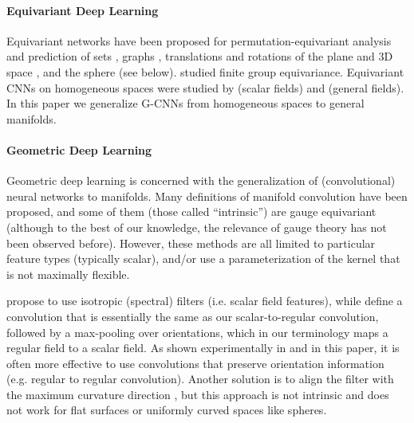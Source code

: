 \documentclass{article}
\begin{document}
\paragraph{Equivariant Deep Learning}
Equivariant networks have been proposed for permutation-equivariant analysis and prediction of sets 
\cite{zaheerDeepSets2017, hartfordDeepModelsInteractions2018}, graphs \cite{kondorCovariantCompositionalNetworks2018, hyPredictingMolecularProperties2018, maronInvariantEquivariantGraph2019}, translations and rotations of the plane and 3D space \cite{oyallonDeepRotoTranslationScattering2015, cohenGroupEquivariantConvolutional2016, cohenSteerableCNNs2017, marcosRotationEquivariantVector2017, weilerLearningSteerableFilters2018, weiler3DSteerableCNNs2018, worrallHarmonicNetworksDeep2017, worrallCubeNetEquivariance3D2018, winkels3DGCNNsPulmonary2018, veelingRotationEquivariantCNNs2018, thomasTensorFieldNetworks2018, bekkersRotoTranslationCovariantConvolutional2018, hoogeboomHexaConv2018}, and the sphere (see below).
\citet{ravanbakhshEquivarianceParameterSharing2017} studied finite group equivariance.
Equivariant CNNs on homogeneous spaces were studied by \cite{kondorGeneralizationEquivarianceConvolution2018} (scalar fields) and \cite{cohenIntertwinersInducedRepresentations2018, cohenGeneralTheoryEquivariant2018} (general fields).
In this paper we generalize G-CNNs from homogeneous spaces to general manifolds.


\paragraph{Geometric Deep Learning}

Geometric deep learning \cite{bronsteinGeometricDeepLearning2016} is concerned with the generalization of (convolutional) neural networks to manifolds.
Many definitions of manifold convolution have been proposed, and some of them (those called ``intrinsic'') are gauge equivariant (although to the best of our knowledge, the relevance of gauge theory has not been observed before).
However, these methods are all limited to particular feature types  (typically scalar), and/or use a parameterization of the kernel that is not maximally flexible.

\citet{brunaSpectralNetworksDeep, boscainiLearningClassSpecific2015} propose to use isotropic (spectral) filters (i.e. scalar field features), while \cite{masciGeodesicConvolutionalNeural2015} define a convolution that is essentially the same as our scalar-to-regular convolution, followed by a max-pooling over orientations, which in our terminology maps a regular field to a scalar field.
As shown experimentally in \cite{cohenGroupEquivariantConvolutional2016, cohenSteerableCNNs2017} and in this paper, it is often more effective to use convolutions that preserve orientation information (e.g. regular to regular convolution).
Another solution is to align the filter with the maximum curvature direction \cite{boscainiLearningShapeCorrespondence2016}, but this approach is not intrinsic and does not work for flat surfaces or uniformly curved spaces like spheres.
\end{document}
